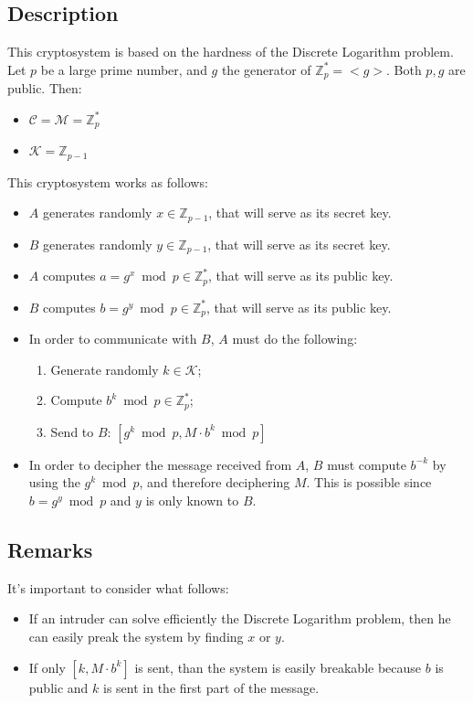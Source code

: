 \subsection{Description}
This cryptosystem is based on the hardness of the Discrete Logarithm problem.\newline
Let $p$ be a large prime number, and $g$ the generator of $\mathbb{Z}_{p}^{*} = <g>$. Both $p, g$ are public. Then:
\begin{itemize}
    \item $\mathcal{C} = \mathcal{M} = \mathbb{Z}_{p}^{*}$
    \item $\mathcal{K} = \mathbb{Z}_{p-1}$
\end{itemize}
This cryptosystem works as follows:
\begin{itemize}
    \item $A$ generates randomly $x \in \mathbb{Z}_{p-1}$, that will serve as its secret key.
    \item $B$ generates randomly $y \in \mathbb{Z}_{p-1}$, that will serve as its secret key.
    \item $A$ computes $a = g^{x} \bmod p \in \mathbb{Z}_{p}^{*}$, that will serve as its public key.
    \item $B$ computes $b = g^{y} \bmod p \in \mathbb{Z}_{p}^{*}$, that will serve as its public key.
    \item In order to communicate with $B$, $A$ must do the following:
    \begin{enumerate}
        \item Generate randomly $k \in \mathcal{K}$;
        \item Compute $b^{k} \bmod p \in \mathbb{Z}_{p}^{*}$;
        \item Send to $B$: $[g^{k} \bmod p, M \cdot b^{k} \bmod p]$
    \end{enumerate}
    \item In order to decipher the message received from $A$, $B$ must compute $b^{-k}$ by using the $g^{k} \bmod p$, and therefore deciphering $M$. This is possible since $b = g^{y} \bmod p$ and $y$ is only known to $B$.
\end{itemize}
\subsection{Remarks}
It's important to consider what follows:
\begin{itemize}
    \item If an intruder can solve efficiently the Discrete Logarithm problem, then he can easily preak the system by finding $x$ or $y$.
    \item If only $[k, M \cdot b^{k}]$ is sent, than the system is easily breakable because $b$ is public and $k$ is sent in the first part of the message.
\end{itemize}
